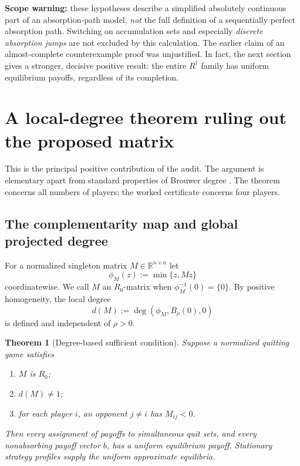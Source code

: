 \documentclass[11pt,a4paper]{article}
\newtheorem{theorem}{Theorem}[section]
\theoremstyle{definition}
\theoremstyle{remark}
\newcommand{\R}{\mathbb{R}}
\begin{document}
\textbf{Scope warning:} these hypotheses describe a simplified absolutely continuous part of an absorption-path model, \emph{not} the full definition of a sequentially perfect absorption path. Switching on accumulation sets and especially \emph{discrete absorption jumps} are not excluded by this calculation. The earlier claim of an almost-complete counterexample proof was unjustified. In fact, the next section gives a stronger, decisive positive result: the entire $R^\dagger$ family has uniform equilibrium payoffs, regardless of its completion.

\section{A local-degree theorem ruling out the proposed matrix}\label{sec:index}
This is the principal positive contribution of the audit. The argument is elementary apart from standard properties of Brouwer degree \cite{gowda2016}. The theorem concerns all numbers of players; the worked certificate concerns four players.

\subsection{The complementarity map and global projected degree}
For a normalized singleton matrix $M\in\R^{n\times n}$ let
\[
\phi_M(z):=\min\{z,Mz\}
\]
coordinatewise. We call $M$ an $R_0$-matrix when $\phi_M^{-1}(0)=\{0\}$. By positive homogeneity, the local degree
\[
d(M):=\deg(\phi_M,B_\rho(0),0)
\]
is defined and independent of $\rho>0$.

\begin{theorem}[Degree-based sufficient condition]\label{thm:degree}
Suppose a normalized quitting game satisfies
\begin{enumerate}[label=(\roman*)]
\item $M$ is $R_0$;
\item $d(M)\ne1$;
\item for each player $i$, an opponent $j\ne i$ has $M_{ij}<0$.
\end{enumerate}
Then \emph{every} assignment of payoffs to simultaneous quit sets, and \emph{every} nonabsorbing payoff vector $b$, has a uniform equilibrium payoff. Stationary strategy profiles supply the uniform approximate equilibria.
\end{theorem}
\end{document}
